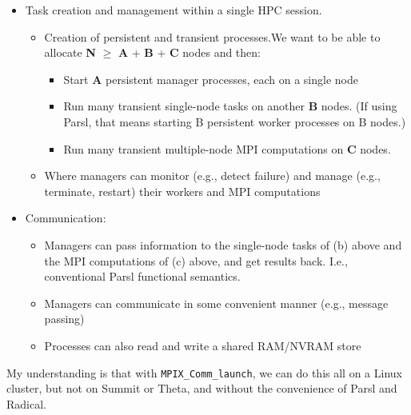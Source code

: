 \documentclass[10pt]{article}
\begin{document}
\begin{itemize}
\item
Task creation and management within a single HPC session.
\begin{itemize}
\item Creation of persistent and transient processes.We want to be able to allocate \textbf{N} $\ge$  \textbf{A} +  \textbf{B} +  \textbf{C} nodes and then:
\begin{itemize}
\item
Start  \textbf{A} persistent manager processes, each on a single node
\item
Run many transient single-node tasks on another \textbf{B} nodes. (If using Parsl, that means starting B persistent worker processes on B nodes.)
\item
Run many transient multiple-node MPI computations on  \textbf{C} nodes.
\end{itemize}
\item
Where managers can monitor (e.g., detect failure) and manage (e.g., terminate, restart) their workers and MPI computations
\end{itemize}
\item
Communication:
\begin{itemize}
\item
Managers can pass information to the single-node tasks of (b) above and the MPI computations of (c) above, and get results back. I.e., conventional Parsl functional semantics.
\item
Managers can communicate in some convenient manner (e.g., message passing)
\item
Processes can also read and write a shared RAM/NVRAM store
\end{itemize}
\end{itemize}

My understanding is that with \texttt{MPIX\_Comm\_launch}, we can do this all on a Linux cluster, but not on Summit or Theta, and without the convenience of Parsl and Radical.
\end{document}
